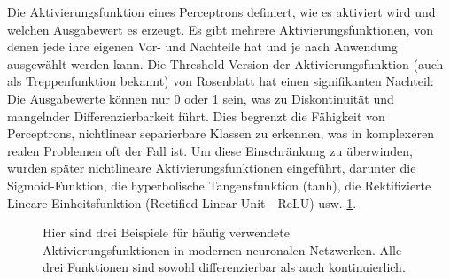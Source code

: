    Die Aktivierungsfunktion eines Perceptrons definiert, wie es aktiviert wird und welchen Ausgabewert es erzeugt. Es gibt mehrere Aktivierungsfunktionen, von denen jede ihre eigenen Vor- und Nachteile hat und je nach Anwendung ausgewählt werden kann. Die Threshold-Version der Aktivierungsfunktion (auch als Treppenfunktion bekannt) von Rosenblatt hat einen signifikanten Nachteil: Die Ausgabewerte können nur 0 oder 1 sein, was zu Diskontinuität und mangelnder Differenzierbarkeit führt. Dies begrenzt die Fähigkeit von Perceptrons, nichtlinear separierbare Klassen zu erkennen, was in komplexeren realen Problemen oft der Fall ist. Um diese Einschränkung zu überwinden, wurden später nichtlineare Aktivierungsfunktionen eingeführt, darunter die Sigmoid-Funktion, die hyperbolische Tangensfunktion (tanh), die Rektifizierte Lineare Einheitsfunktion (Rectified Linear Unit - ReLU) usw.  \ref{fig:background:Aktivierungsfunktionen}.   

    \begin{figure}[htbp]
    \centering
        \caption[Aktivierungsfunktionen]{Hier sind drei Beispiele für häufig verwendete Aktivierungsfunktionen in modernen neuronalen Netzwerken. Alle drei Funktionen sind sowohl differenzierbar als auch kontinuierlich.}
        \label{fig:background:Aktivierungsfunktionen}
    \end{figure}

